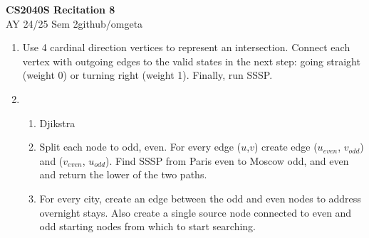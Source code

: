 \documentclass[12pt, a4paper]{article}
\newcommand{\mytitle}{CS2040S Recitation 8}
\newcommand{\myauthor}{github/omgeta}
\newcommand{\mydate}{AY 24/25 Sem 2}
\begin{document}
\raggedright
\footnotesize
\begin{center}
{\normalsize{\textbf{\mytitle}}} \\
{\footnotesize{\mydate\hspace{2pt}\textemdash\hspace{2pt}\myauthor}}
\end{center}
\begin{enumerate}[Q\arabic*.]
  \item Use 4 cardinal direction vertices to represent an intersection. Connect each vertex with outgoing edges to the valid states in the next step: going straight (weight 0) or turning right (weight 1). Finally, run SSSP.

  \item 
    \begin{enumerate}[\roman*.]
      \item Djikstra

      \item Split each node to odd, even. For every edge ($u$,$v$) create edge ($u_{even}$, $v_{odd}$) and ($v_{even}$, $u_{odd}$). Find SSSP from Paris even to Moscow odd, and even and return the lower of the two paths.

      \item For every city, create an edge between the odd and even nodes to address overnight stays. Also create a single source node connected to even and odd starting nodes from which to start searching.
    \end{enumerate}
\end{enumerate}
\end{document}
